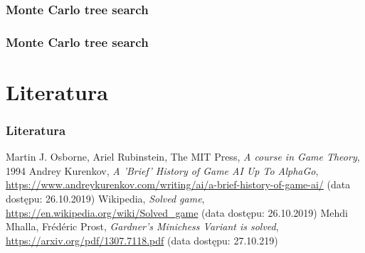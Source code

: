 \documentclass[polish,envcountsect,10pt]{beamer}
\begin{document}
            \subsubsection{Monte Carlo tree search}
                \begin{frame}
                    \frametitle{Monte Carlo tree search}
                \end{frame}
    \section{Literatura}
        \begin{frame}
            \frametitle{Literatura}
            \begin{thebibliography}{9}
                Martin J. Osborne, Ariel Rubinstein, The MIT Press, \emph{A course in Game Theory}, 1994
                Andrey Kurenkov, \emph{A 'Brief' History of Game AI Up To AlphaGo}, \url{https://www.andreykurenkov.com/writing/ai/a-brief-history-of-game-ai/} (data dostępu: 26.10.2019)
                Wikipedia, \emph{Solved game}, \url{https://en.wikipedia.org/wiki/Solved_game} (data dostępu: 26.10.2019)
                Mehdi Mhalla, Fr\'ed\'eric Prost, \emph{Gardner’s Minichess Variant is solved}, \url{https://arxiv.org/pdf/1307.7118.pdf} (data dostępu: 27.10.219)
            \end{thebibliography}
        \end{frame}
\end{document}
